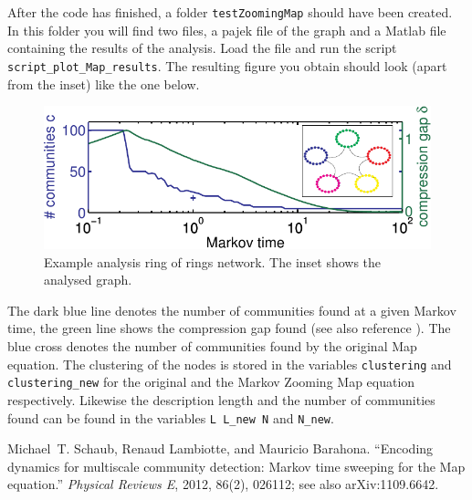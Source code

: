 \documentclass[a4paper,10pt]{scrartcl}
\begin{document}
After the code has finished, a folder \texttt{testZoomingMap} should have been created. In this folder you will find two files, a pajek file of the graph and a Matlab file containing the results of the analysis. Load the file and run the script \texttt{script\_plot\_Map\_results}. The resulting figure you obtain should look (apart from the inset) like the one below.
\begin{figure}[tb!]
 \centering
 \includegraphics{./test.pdf}
 \caption{Example analysis ring of rings network. The inset shows the analysed graph.}
 \label{fig:1}
\end{figure}
The dark blue line denotes the number of communities found at a given Markov time, the green line shows the compression gap found (see also reference \cite{Schaub2012} ).
The blue cross denotes the number of communities found by the original Map equation.
The clustering of the nodes is stored in the variables \texttt{clustering} and \texttt{clustering\_new} for the original and the Markov Zooming Map equation respectively.
Likewise the description length and the number of communities found can be found in the variables \texttt{L L\_new N} and \texttt{N\_new}.

\begin{thebibliography}{1}
Michael~T. Schaub, Renaud Lambiotte, and Mauricio Barahona.
\newblock ``{E}ncoding dynamics for multiscale community detection: {M}arkov time sweeping for the {M}ap equation.''
\newblock \textit{Physical Reviews E}, 2012, 86(2), 026112; see also arXiv:1109.6642.
\end{thebibliography}
\end{document}
